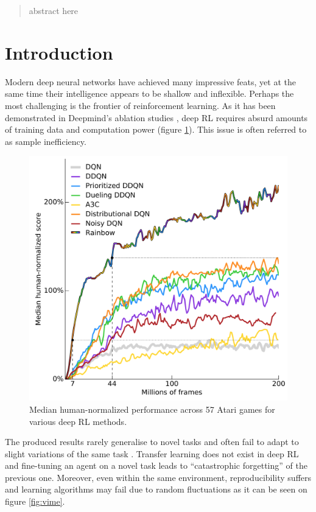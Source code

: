 \documentclass[12pt]{article}
\begin{document}
\maketitle
\lstset{
	basicstyle=\ttfamily,
	mathescape
}


\begin{abstract}
	abstract here
\end{abstract} 
\tableofcontents
\section{Introduction}

Modern deep neural networks have achieved many impressive feats, yet at the same time their intelligence appears to be shallow and inflexible. Perhaps the most challenging is the frontier of reinforcement learning.  As it has been demonstrated in Deepmind's ablation studies \cite{rainbow_dqn}, deep RL requires absurd amounts of training data and computation power (figure \ref{fig:dqn}). This issue is often referred to as sample inefficiency.
\begin{figure}[!htbp]
	\centering
	\includegraphics[width=13cm]{dqn}
	\caption{Median human-normalized performance across
		57 Atari games for various deep RL methods.}
	\label{fig:dqn}
\end{figure} 
The produced results rarely generalise to novel tasks and often fail to adapt to slight variations of the same task \cite{generalisation_in_rl}. Transfer learning does not exist in deep RL and fine-tuning an agent on a novel task leads to ``catastrophic forgetting'' of the previous one. Moreover, even within the same environment, reproducibility suffers and learning algorithms may fail due to random fluctuations\cite{vime} as it can be seen on figure \ref{fig:vime}. 
\end{document}
